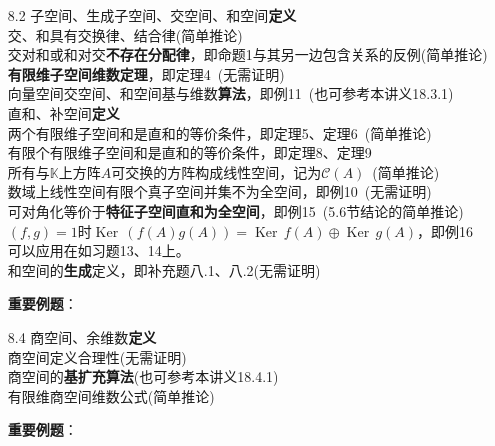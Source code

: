 \documentclass[a4paper,UTF8,fontset=windows,AutoFakeBold]{ctexart}
\DeclareMathOperator{\Ker}{Ker\,}
\newcommand*{\mc}{\mathcal{C}}
\newcommand*{\note}{\noindent *}
\begin{document}
\begin{enumerate}
    \item[8.2] 子空间、生成子空间、交空间、和空间\textbf{定义}
    \\交、和具有交换律、结合律(简单推论)
    \\交对和或和对交\textbf{不存在分配律}，即命题1与其另一边包含关系的反例(简单推论)
    \\\textbf{有限维子空间维数定理}，即定理4\ (无需证明)
    \\向量空间交空间、和空间基与维数\textbf{算法}，即例11\ (也可参考本讲义18.3.1)
    \\直和、补空间\textbf{定义}
    \\两个有限维子空间和是直和的等价条件，即定理5、定理6\ (简单推论)
    \\有限个有限维子空间和是直和的等价条件，即定理8、定理9
    \\所有与$\mathbb{K}$上方阵$A$可交换的方阵构成线性空间，记为$\mc(A)$\ (简单推论)
    \\数域上线性空间有限个真子空间并集不为全空间，即例10\ (无需证明)
    \\可对角化等价于\textbf{特征子空间直和为全空间}，即例15\ (5.6节结论的简单推论)
    \\$(f,g)=1$时$\Ker(f(A)g(A))=\Ker f(A)\oplus\Ker g(A)$，即例16
    \\\note 可以应用在如习题13、14上。
    \\和空间的\textbf{生成}定义，即补充题八.1、八.2(无需证明)
    
    \textbf{重要例题}：

    \item[8.4] 商空间、余维数\textbf{定义}
    \\商空间定义合理性(无需证明)
    \\商空间的\textbf{基扩充算法}(也可参考本讲义18.4.1)
    \\有限维商空间维数公式(简单推论)
    
    \textbf{重要例题}：
\end{enumerate}
\end{document}
